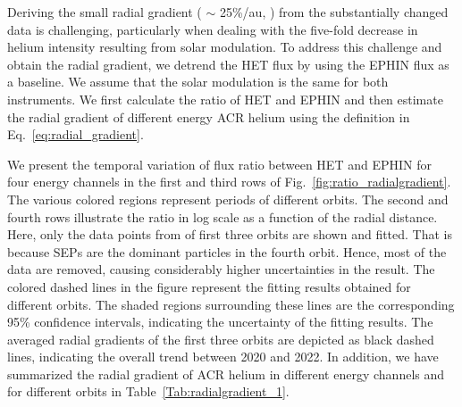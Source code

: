 Deriving the small radial gradient ( $\sim$ 25\%/au, \citet{Rankin2021ApJ}) from the substantially changed data is challenging, particularly when dealing with the five-fold decrease in helium intensity resulting from solar modulation.
To address this challenge and obtain the radial gradient, we detrend the \ac{HET} flux by using the \ac{EPHIN} flux as a baseline. We assume that the solar modulation is the same for both instruments. We first calculate the ratio of \ac{HET} and \ac{EPHIN} and then estimate the radial gradient of different energy \ac{ACR} helium using the definition in Eq.~\ref{eq:radial_gradient}.

We present the temporal variation of flux ratio between \ac{HET} and \ac{EPHIN} for four energy channels in the first and third rows of Fig.~\ref{fig:ratio_radialgradient}. The various colored regions represent periods of different orbits. The second and fourth rows illustrate the ratio in log scale as a function of the radial distance. Here, only the data points from of first three orbits are shown and fitted. That is because \acp{SEP} are the dominant particles in the fourth orbit. Hence, most of the data are removed, causing considerably higher uncertainties in the result. The colored dashed lines in the figure represent the fitting results obtained for different orbits. The shaded regions surrounding these lines are the corresponding 95\% confidence intervals,  indicating the uncertainty of the fitting results. The averaged radial gradients of the first three orbits are depicted as black dashed lines, indicating the overall trend between 2020 and 2022.
In addition, we have summarized the radial gradient of \ac{ACR} helium in different energy channels and for different orbits in Table~\ref{Tab:radialgradient_1}.

